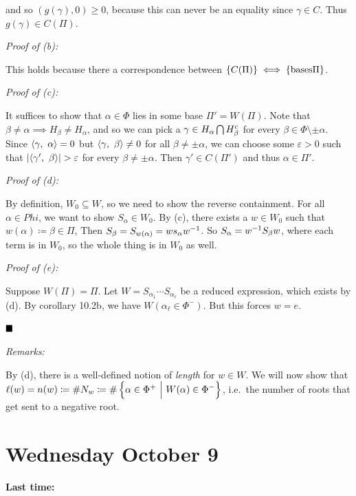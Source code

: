 and so \((g(\gamma), 0) \geq 0\), because this can never be an equality
since \(\gamma \in C\). Thus \(g(\gamma) \in C(\Pi)\).

\emph{Proof of (b):}

This holds because there a correspondence between
\(\left\{{C(\Pi)}\right\} \iff \left\{{\text{bases} \Pi}\right\}\).

\emph{Proof of (c):}

It suffices to show that \(\alpha \in \Phi\) lies in some base
\(\Pi' = W(\Pi)\). Note that
\(\beta\neq\alpha \implies H_\beta \neq H_\alpha\), and so we can pick a
\(\gamma \in H_\alpha \bigcap H_\beta^c\) for every
\(\beta \in \Phi \setminus{\pm \alpha}\). Since
\({\left\langle {\gamma},~{\alpha} \right\rangle} = 0\) but \({\left\langle {\gamma},~{\beta} \right\rangle} \neq 0\) for
all \(\beta \neq \pm \alpha\), we can choose some \(\varepsilon > 0\)
such that \({\left\lvert {{\left\langle {\gamma'},~{\beta} \right\rangle}} \right\rvert} > \varepsilon\) for every
\(\beta\neq\pm\alpha\). Then \(\gamma' \in C(\Pi')\) and thus
\(\alpha \in \Pi'\).

\emph{Proof of (d):}

By definition, \(W_0 \subseteq W\), so we need to show the reverse
containment. For all \(\alpha \in Phi\), we want to show
\(S_\alpha \in W_0\). By (c), there exists a \(w\in W_0\) such that
\(w(\alpha) \coloneqq \beta \in \Pi\), Then
\(S_\beta = S_{w(\alpha)} = w s_\alpha w^{-1}\). So
\(S_\alpha = w^{-1} S_\beta w\), where each term is in \(W_0\), so the
whole thing is in \(W_0\) as well.

\emph{Proof of (e):}

Suppose \(W(\Pi) = \Pi\). Let
\(W = S_{\alpha_1} \cdots S_{\alpha_\ell}\) be a reduced expression,
which exists by (d). By corollary 10.2b, we have
\(W(\alpha_\ell \in \Phi^-)\). But this forces \(w = e\).

\(\qed\)

\emph{Remarks:}

By (d), there is a well-defined notion of \emph{length} for \(w\in W\).
We will now show that
\(\ell(w) = n(w) \coloneqq \# N_w \coloneqq \# \left\{{\alpha \in \Phi^+ {~\mathrel{\Big|}~} W(\alpha) \in \Phi^-}\right\}\),
i.e.~the number of roots that get sent to a negative root.

\hypertarget{wednesday-october-9}{%
\section{Wednesday October 9}\label{wednesday-october-9}}

\textbf{Last time:}

